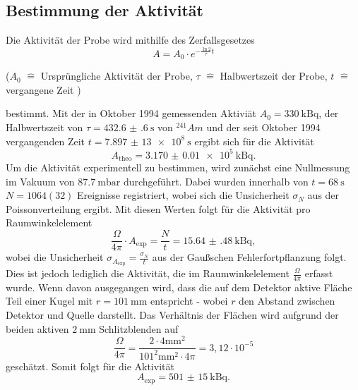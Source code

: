 \subsection{Bestimmung der Aktivität}
Die Aktivität der Probe wird mithilfe des Zerfallsgesetzes
\begin{equation}
    A = A_0 \cdot e^{-\frac{\ln{2}}{\tau}t}
\end{equation}

\begin{center}
    \tiny{($A_0 $ $\hat{=}$ Ursprüngliche Aktivität der Probe, $\tau$ $\hat{=}$ Halbwertszeit der Probe, $t$ $\hat{=}$ vergangene Zeit )}
\end{center}
bestimmt.
Mit der in Oktober 1994 gemessenden Aktiviät $A_0 = \SI{330}{\kilo\becquerel}$, der Halbwertszeit von $\tau = \SI{432.6(6)}{\second}$ von $^{241}{Am}$ und der seit Oktober 1994 vergangenden Zeit $t = \SI{7,897(13)e8}{\second}$ ergibt sich für die Aktivität
\begin{equation}
    A_\text{theo} = \SI{3.170(10)e5}{\kilo\becquerel} .
\end{equation}
Um die Aktivität experimentell zu bestimmen, wird zunächst eine Nullmessung im Vakuum von $\SI{87,7}{\milli \bar}$ durchgeführt. Dabei wurden innerhalb von $t=\SI{68}{\second}$ $N=1064(32)$ Ereignisse registriert, wobei sich die Unsicherheit $\sigma_N$ aus der Poissonverteilung ergibt.
Mit diesen Werten folgt für die Aktivität pro Raumwinkelelement
\begin{equation}
    \frac{\Omega}{4 \pi } \cdot  A_\text{exp} = \frac{N}{t} = \SI{15.64(48)}{\kilo\becquerel} ,
\end{equation}
wobei die Unsicherheit $\sigma_{ A_\text{exp}} = \frac{\sigma_N}{t}$ aus der Gaußschen Fehlerfortpflanzung folgt.
Dies ist jedoch lediglich die Aktivität, die im Raumwinkelelement $\frac{\Omega}{4 \pi}$ erfasst wurde. Wenn davon ausgegangen wird, dass die auf dem Detektor aktive Fläche Teil einer Kugel mit $r = \SI{101}{\milli \meter}$ entspricht - wobei $r$ den Abstand zwischen Detektor und Quelle darstellt.
Das Verhältnis der Flächen wird aufgrund der beiden aktiven  $\SI{2}{\milli \meter}$ Schlitzblenden auf
\begin{equation}
    \frac{\Omega}{4 \pi } = \frac{2 \cdot 4 \si{\milli \meter}^2}{101^2 \si{\milli \meter}^2 \cdot 4\pi } = 3,12 \cdot 10^{-5}
\end{equation}
geschätzt.
Somit folgt für die Aktivität
\begin{equation}
    A_\text{exp} = \SI{501(15)}{\kilo\becquerel} .
\end{equation}

